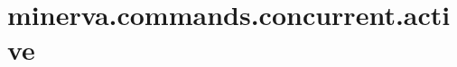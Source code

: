 \section{minerva.commands.concurrent.active}
\label{configuration:MinervaCommandsConcurrentActive}
\AvailableInCsharpOnly{\TODO}